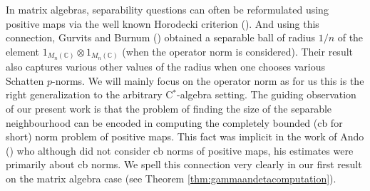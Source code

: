 \documentclass[11pt]{article}
\numberwithin{theorem}{section}
\begin{document}
In matrix algebras, separability questions can often be reformulated using positive maps via the well known Horodecki criterion (\cite{MR1421501}). And using this connection, Gurvits and Burnum (\cite{Gurvits-Barnum}) obtained a separable ball of radius $1/n$ of the element $1_{M_n(\mathbb{C})}\otimes 1_{M_{n}(\mathbb{C})}$ (when the operator norm is considered). Their result also captures various other values of the  radius when one chooses various Schatten $p$-norms. 
We will mainly focus on the operator norm as for us this is the right generalization to the arbitrary C$^*$-algebra setting.  The guiding observation of our present work is that the problem of finding the size of the separable neighbourhood can be encoded in computing the completely bounded (cb for short) norm problem of positive maps. This fact was implicit in the work of Ando (\cite{Ando}) who although did not consider cb norms of positive maps, his estimates were primarily about cb norms. We spell this connection very clearly in our first result on the matrix algebra case (see Theorem \ref{thm:gammaandetacomputation}).
\end{document}
